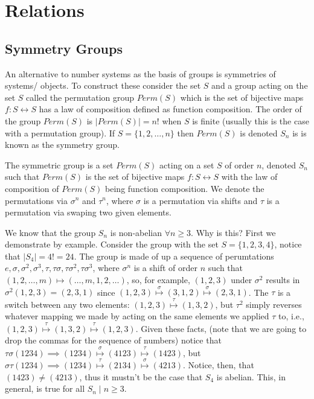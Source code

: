 \documentclass{article}
\begin{document}

\section{Relations}


\subsection{Symmetry Groups}

An alternative to number systems as the basis of groups is symmetries of systems/ objects. To construct these consider the set \( S \) and a group acting on the set \( S \) called the permutation group \( Perm(S) \) which is the set of bijective maps \( f: S \leftrightarrow S \) has a law of composition defined as function composition. The order of the group \( Perm(S) \) is \( |Perm(S)| =n! \) when \( S \) is finite (usually this is the case with a permutation group). If \( S = \{ 1,2,\ldots ,n \} \) then \( Perm(S) \) is denoted \( S_n \) is is known as the symmetry group.

\begin{definition}
  The symmetric group is a set \( Perm(S) \) acting on a set \( S \) of order \( n \), denoted \( S_n \) such that \( Perm(S) \) is the set of bijective maps \( f: S \leftrightarrow S \) with the law of composition of \( Perm(S) \) being function composition. We denote the permutations via \( \sigma^n  \) and \( \tau ^n \), where \( \sigma  \) is a permutation via shifts and \( \tau  \) is a permutation via swaping two given elements. 
\end{definition}


\begin{problem}[1.1.1]
  We know that the group \( S_n \) is non-abelian \( \forall n\ge 3 \). Why is this? First we demonstrate by example. Consider the group with the set \( S =\{1,2,3,4\}\), notice that \( |S_4| =4! =24 \). The group is made of up a sequence of perumtations \( e,\sigma ,\sigma^2,\sigma^3,\tau ,\tau \sigma ,\tau \sigma^2,\tau \sigma^3 \), where \( \sigma ^n \) is a shift of order \( n \) such that \( (1,2,\ldots,m )\mapsto (\ldots ,m,1,2,\ldots ) \), so, for example, \( (1,2,3)\) under \( \sigma^2 \) results in \(\sigma^2(1,2,3)=(2,3,1)\) since \( (1,2,3)\overset{\sigma}{\mapsto} (3,1,2) \overset{\sigma}{\mapsto} (2,3,1) \). The \( \tau  \) is a switch between any two elements: \( (1,2,3)\overset{\tau}{\mapsto}(1,3,2) \), but \( \tau ^2 \) simply reverses whatever mapping we made by acting on the same elements we applied \( \tau  \) to, i.e., \( (1,2,3)\overset{\tau}{\mapsto}(1,3,2)\overset{\tau }{\mapsto}(1,2,3) \). Given these facts, (note that we are going to drop the commas for the sequence of numbers) notice that \( \tau \sigma (1234) \implies (1234)\overset{\sigma}{\mapsto} (4123) \overset{\tau }{\mapsto} (1423)\), but \( \sigma \tau (1234)\implies (1234)\overset{\tau }{\mapsto} (2134) \overset{\sigma  }{\mapsto} (4213) \). Notice, then, that \( (1423)\neq (4213) \), thus it mustn't be the case that \( S_4 \) is abelian. This, in general, is true for all \( S_n \mid n\ge 3 \). 
\end{problem}
\end{document}
